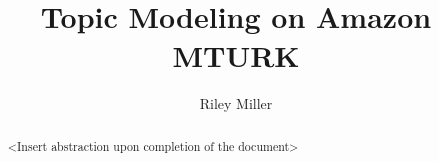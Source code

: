 \documentclass[letterpaper,12pt]{article}
\title{Topic Modeling on Amazon MTURK}
\author{Riley Miller}
\begin{document}


\frontmatter


\maketitle
\newpage


\makecopyright{\the\year}
\newpage


\makesubmittal
\newpage


\begin{abstract}
<Insert abstraction upon completion of the document>
\end{abstract}

\newpage


\tableofcontents
\newpage



\listoffigures
\newpage
\listoftables
\newpage




\end{document}

